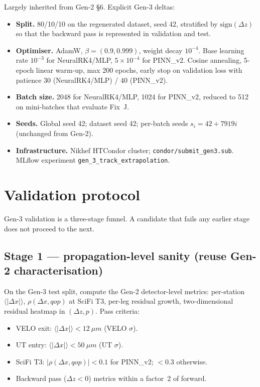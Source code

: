 \documentclass[a4paper,11pt]{article}
\newcommand{\SI}[2]{#1~#2}
\newcommand{\dz}{\Delta z}
\begin{document}
Largely inherited from Gen-2 §6.  Explicit Gen-3 deltas:

\begin{itemize}
  \item \textbf{Split.}  80/10/10 on the regenerated dataset, seed
        42, stratified by $\text{sign}(\dz)$ so that the backward
        pass is represented in validation and test.
  \item \textbf{Optimiser.}  AdamW, $\beta=(0.9,0.999)$, weight
        decay $10^{-4}$.  Base learning rate $10^{-3}$ for
        NeuralRK4/MLP, $5\times 10^{-4}$ for PINN\_v2.  Cosine
        annealing, 5-epoch linear warm-up, max 200 epochs, early
        stop on validation loss with patience 30 (NeuralRK4/MLP) /
        40 (PINN\_v2).
  \item \textbf{Batch size.}  2048 for NeuralRK4/MLP, 1024 for
        PINN\_v2, reduced to 512 on mini-batches that evaluate
        Fix~J.
  \item \textbf{Seeds.}  Global seed 42; dataset seed 42; per-batch
        seeds $s_i = 42 + 7919 i$ (unchanged from Gen-2).
  \item \textbf{Infrastructure.}  Nikhef HTCondor cluster;
        \texttt{condor/submit\_gen3.sub}.  MLflow experiment
        \texttt{gen\_3\_track\_extrapolation}.
\end{itemize}

\section{Validation protocol}\label{gen3:sec:validation}

Gen-3 validation is a three-stage funnel.  A candidate that fails any
earlier stage does not proceed to the next.

\subsection{Stage 1 --- propagation-level sanity (reuse Gen-2
characterisation)}

On the Gen-3 test split, compute the Gen-2 detector-level metrics:
per-station $\langle|\Delta x|\rangle$,
$\rho(\Delta x,qop)$ at SciFi T3, per-leg residual growth,
two-dimensional residual heatmap in $(\dz, p)$.  Pass criteria:
\begin{itemize}
  \item VELO exit: $\langle|\Delta x|\rangle < \SI{12}{\mu m}$
        (VELO $\sigma$).
  \item UT entry:  $\langle|\Delta x|\rangle < \SI{50}{\mu m}$
        (UT $\sigma$).
  \item SciFi T3: $|\rho(\Delta x,qop)|<0.1$ for PINN\_v2; $<0.3$
        otherwise.
  \item Backward pass ($\dz<0$) metrics within a factor~2 of forward.
\end{itemize}
\end{document}
